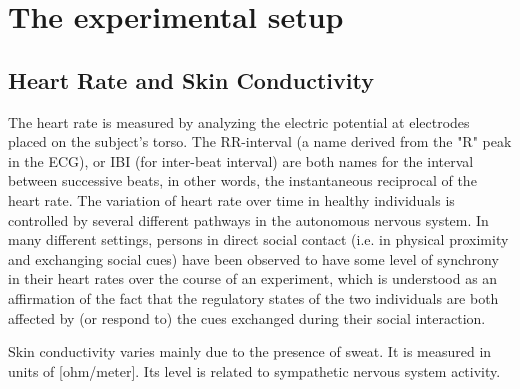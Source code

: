\documentclass[a4paper, 11pt]{article}      %
\begin{document}
\section{The experimental setup}

\subsection{Heart Rate and Skin Conductivity}
The heart rate is measured by analyzing the electric potential at electrodes placed on the subject's torso. The RR-interval (a name derived from the "R" peak in the ECG), or IBI (for inter-beat interval) are both names for the interval between successive beats, in other words, the instantaneous reciprocal of the heart rate. The variation of heart rate over time in healthy individuals is controlled by several different pathways in the autonomous nervous system. In many different settings, persons in direct social contact (i.e. in physical proximity and exchanging social cues) have been observed to have some level of synchrony in their heart rates over the course of an experiment, which is understood as an affirmation of the fact that the regulatory states of the two individuals are both affected by (or respond to) the cues exchanged during their social interaction.

Skin conductivity varies mainly due to the presence of sweat. It is measured in units of [ohm\slash meter]. Its level is related to sympathetic nervous system activity.
\end{document}
